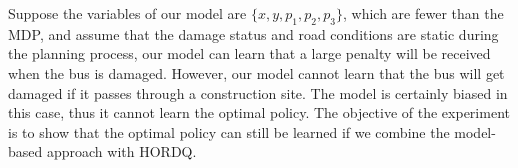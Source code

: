 
Suppose the variables of our model are $\{x, y, p_1, p_2, p_3\}$, which are fewer than the MDP, and assume
that the damage status and road conditions are static during the planning
process, our model can learn that a large penalty will be received when the bus
is damaged. However, our model cannot learn that the bus will get damaged if
it passes through a construction site. The model is certainly biased in this
case, thus it cannot learn the optimal policy. The objective of the experiment
is to show that the optimal policy can still be learned if we combine the
model-based approach with HORDQ. 



